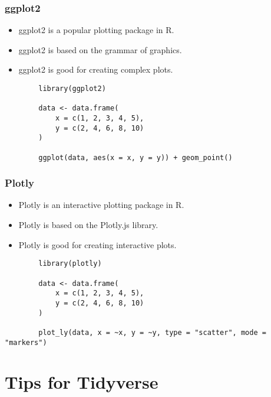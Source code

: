 \documentclass[serif, 9pt, aspectratio=32]{beamer}
\begin{document}
\begin{frame}
    \centering
    \frametitle{ggplot2}
    \begin{itemize}
        \setlength{\itemsep}{2em}
        \item ggplot2 is a popular plotting package in R.
        \item ggplot2 is based on the grammar of graphics.
        \item ggplot2 is good for creating complex plots.
    \end{itemize}
\end{frame}

\begin{frame}[fragile]
    \begin{lstlisting}
        library(ggplot2)

        data <- data.frame(
            x = c(1, 2, 3, 4, 5),
            y = c(2, 4, 6, 8, 10)
        )

        ggplot(data, aes(x = x, y = y)) + geom_point()
    \end{lstlisting}
\end{frame}

\begin{frame}
    \centering
    \frametitle{Plotly}
    \begin{itemize}
        \setlength{\itemsep}{2em}
        \item Plotly is an interactive plotting package in R.
        \item Plotly is based on the Plotly.js library.
        \item Plotly is good for creating interactive plots.
    \end{itemize}
\end{frame}

\begin{frame}[fragile]
    \begin{lstlisting}
        library(plotly)

        data <- data.frame(
            x = c(1, 2, 3, 4, 5),
            y = c(2, 4, 6, 8, 10)
        )

        plot_ly(data, x = ~x, y = ~y, type = "scatter", mode = "markers")
    \end{lstlisting}
\end{frame}

\section{Tips for Tidyverse}
\end{document}
